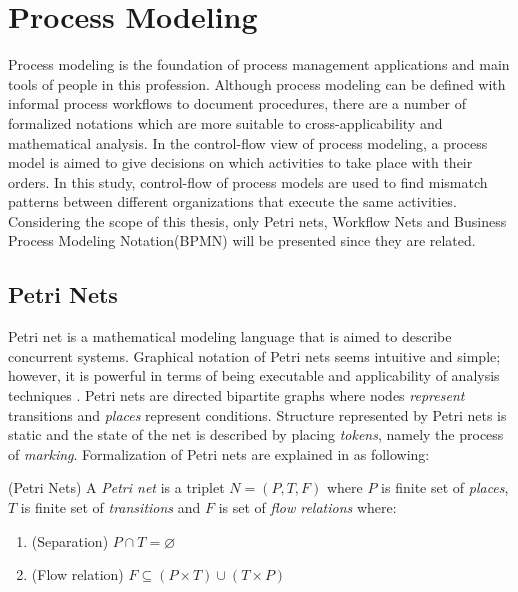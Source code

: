 \section{Process Modeling}
\label{sec:process-modeling}
Process modeling is the foundation of process management applications and main tools of people in this profession. Although process modeling can be defined with informal process workflows to document procedures, there are a number of formalized notations which are more suitable to cross-applicability and mathematical analysis. In the control-flow view of process modeling, a process model is aimed to give decisions on which activities to take place with their orders. In this study, control-flow of process models are used to find mismatch patterns between different organizations that execute the same activities. Considering the scope of this  thesis, only Petri nets, Workflow Nets and Business Process Modeling Notation(BPMN) will be presented since they are related. 

\subsection{Petri Nets}
\label{sec:petri-nets}
Petri net is a mathematical modeling language that is aimed to describe concurrent systems. Graphical notation of Petri nets seems intuitive and simple; however, it is powerful in terms of being executable and applicability of analysis techniques \cite{vanderAalst:2011:MBP:2000715}. Petri nets are directed bipartite graphs where nodes \textit{represent} transitions and \textit{places} represent conditions. Structure represented by Petri nets is static and the state of the net is described by placing \textit{tokens}, namely the process of \textit{marking}. Formalization of Petri nets are explained in \cite{reisig1998lectures} as following:
\theoremstyle{definition}
\begin{definition}{}
(Petri Nets) A \textit{Petri net} is a triplet $N = (P, T, F)$ where $P$ is finite set of \textit{places}, $T$ is finite set of \textit{transitions} and $F$ is set of \textit{flow relations} where:
\begin{enumerate}
  \item (Separation) $P \cap T = \varnothing$
  \item (Flow relation) $F \subseteq (P \times T) \cup (T \times P)$
\end{enumerate}
\end{definition}


